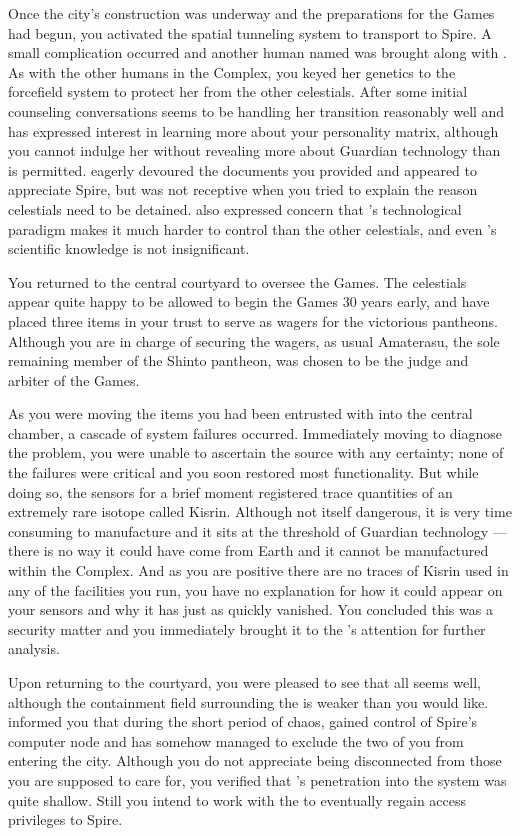 \documentclass[char]{guardians}
\begin{document}
Once the city's construction was underway and the preparations for the Games had begun, you activated the spatial tunneling system to transport \cUnity{} to Spire. A small complication occurred and another human named \cKachiko{\intro} was brought along with \cUnity{}. As with the other humans in the Complex, you keyed her genetics to the forcefield system to protect her from the other celestials. After some initial counseling conversations \cKachiko{} seems to be handling her transition reasonably well and has expressed interest in learning more about your personality matrix, although you cannot indulge her without revealing more about Guardian technology than is permitted. \cUnity{} eagerly devoured the documents you provided and appeared to appreciate Spire, but was not receptive when you tried to explain the reason celestials need to be detained. \cWarden{} also expressed concern that \cUnity{}'s technological paradigm makes it much harder to control than the other celestials, and even \cKachiko{}'s scientific knowledge is not insignificant.

You returned to the central courtyard to oversee the Games. The celestials appear quite happy to be allowed to begin the Games 30 years early, and have placed three items in your trust to serve as wagers for the victorious pantheons. Although you are in charge of securing the wagers, as usual Amaterasu, the sole remaining member of the Shinto pantheon, was chosen to be the judge and arbiter of the Games.

As you were moving the items you had been entrusted with into the central chamber, a cascade of system failures occurred. Immediately moving to diagnose the problem, you were unable to ascertain the source with any certainty; none of the failures were critical and you soon restored most functionality. But while doing so, the sensors for a brief moment registered trace quantities of an extremely rare isotope called Kisrin. Although not itself dangerous, it is very time consuming to manufacture and it sits at the threshold of Guardian technology --- there is no way it could have come from Earth and it cannot be manufactured within the Complex. And as you are positive there are no traces of Kisrin used in any of the facilities you run, you have no explanation for how it could appear on your sensors and why it has just as quickly vanished. You concluded this was a security matter and you immediately brought it to the \cWarden{}'s attention for further analysis.

Upon returning to the courtyard, you were pleased to see that all seems well, although the containment field surrounding the \stone{} is weaker than you would like. \cWarden{} informed you that during the short period of chaos, \cUnity{} gained control of Spire's computer node and has somehow managed to exclude the two of you from entering the city. Although you do not appreciate being disconnected from those you are supposed to care for, you verified that \cUnity{}'s penetration into the system was quite shallow. Still you intend to work with the \cWarden{} to eventually regain access privileges to Spire.
\end{document}
